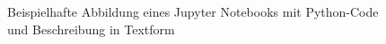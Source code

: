 \begin{figure}[H]
    \centering
    \caption[Jupyter Notebook]{Beispielhafte Abbildung eines Jupyter Notebooks mit Python-Code und Beschreibung in Textform}
    \label{fig:Bild3.5}
\end{figure}